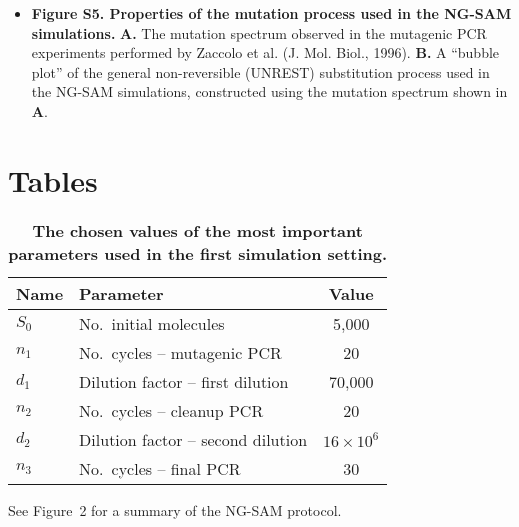 \documentclass[10pt]{article}
\begin{document}
\begin{itemize}

\item {\bf Figure S5. Properties of the mutation process used in the NG-SAM simulations.} 
{\bf A.} The mutation spectrum observed in the mutagenic PCR experiments performed by Zaccolo et al. (J. Mol. Biol., 1996). {\bf B.} A ``bubble plot'' of the general non-reversible (UNREST) substitution process used in the NG-SAM simulations, constructed using the mutation spectrum shown in {\bf A}.

\end{itemize}

\section*{Tables}

\begin{table}[H]
\caption{
\bf{The chosen values of the most important parameters used in the first simulation setting.}}
  \begin{tabular}{|l|l|c|}
    \hline
     Name           & Parameter                      & Value                \\
    \hline
    $S_0$           & No.\ initial molecules          & 5,000                 \\
    \hline
    $n_1$           & No.\ cycles -- mutagenic PCR     & 20                   \\
    \hline
    $d_1$           & Dilution factor -- first dilution  & 70,000              \\
    \hline
    $n_2$           & No.\ cycles -- cleanup PCR       & 20                   \\
    \hline
    $d_2$           & Dilution factor -- second dilution  & $16 \times 10^6$ \\
    \hline
    $n_3$           & No.\ cycles -- final PCR      & 30                      \\
    \hline
   \end{tabular}
    \begin{flushleft} See Figure~2 for a summary of the NG-SAM protocol.
    \end{flushleft}
\label{table1}
\end{table}
\end{document}
